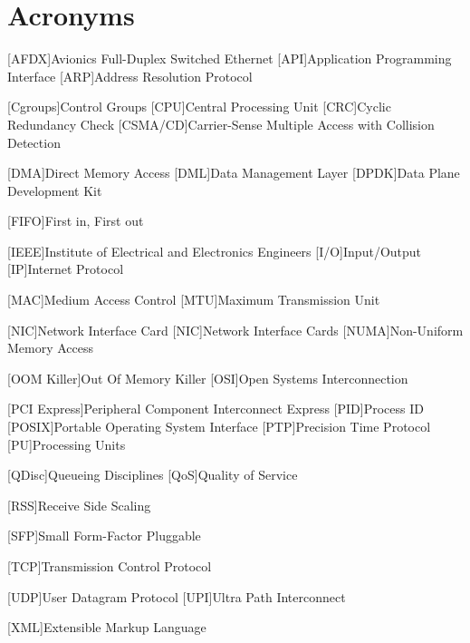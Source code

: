 \cleardoublepage

\chapter*{Acronyms}

\begin{acronym}


[AFDX]{Avionics Full-Duplex Switched Ethernet}
[API]{Application Programming Interface}
[ARP]{Address Resolution Protocol}

[Cgroups]{Control Groups}
[CPU]{Central Processing Unit}
[CRC]{Cyclic Redundancy Check}
[CSMA/CD]{Carrier-Sense Multiple Access with Collision Detection}

[DMA]{Direct Memory Access}
[DML]{Data Management Layer}
[DPDK]{Data Plane Development Kit}

[FIFO]{First in, First out}

[IEEE]{Institute of Electrical and Electronics Engineers}
[I/O]{Input/Output}
[IP]{Internet Protocol}

[MAC]{Medium Access Control}
[MTU]{Maximum Transmission Unit}

[NIC]{Network Interface Card}
[NIC]{Network Interface Cards}
[NUMA]{Non-Uniform Memory Access}

[OOM Killer]{Out Of Memory Killer}
[OSI]{Open Systems Interconnection}

[PCI Express]{Peripheral Component Interconnect Express}
[PID]{Process ID}
[POSIX]{Portable Operating System Interface}
[PTP]{Precision Time Protocol}
[PU]{Processing Units}

[QDisc]{Queueing Disciplines}
[QoS]{Quality of Service}

[RSS]{Receive Side Scaling}

[SFP]{Small Form-Factor Pluggable}

[TCP]{Transmission Control Protocol}

[UDP]{User Datagram Protocol}
[UPI]{Ultra Path Interconnect}

[XML]{Extensible Markup Language}


\end{acronym}